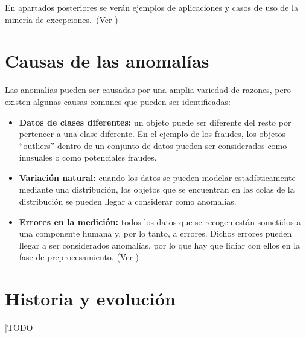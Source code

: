 En apartados posteriores se verán ejemplos de aplicaciones y casos de uso de la minería de
excepciones.~(Ver )

\section{Causas de las anomalías}
Las anomalías pueden ser causadas por una amplia variedad de razones, pero existen algunas
causas comunes que pueden ser identificadas:

\begin{itemize}
	\item \textbf{Datos de clases diferentes:} un objeto puede ser diferente del resto por
		pertencer a una clase diferente. En el ejemplo de los fraudes, los objetos ``outliers''
		dentro de un conjunto de datos pueden ser considerados como inusuales o como potenciales
		fraudes.
	\item \textbf{Variación natural:} cuando los datos se pueden modelar estadísticamente
		mediante una distribución, los objetos que se encuentran en las colas de la distribución
		se pueden llegar a considerar como anomalías.
	\item \textbf{Errores en la medición:} todos los datos que se recogen están sometidos a una
		componente humana y, por lo tanto, a errores. Dichos errores pueden llegar a ser
		considerados anomalías, por lo que hay que lidiar con ellos en la fase de preprocesamiento.
		(Ver )
\end{itemize}

\section{Historia y evolución}
|TODO|
